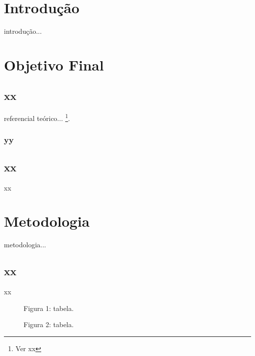 \documentclass[12pt]{article}
\begin{document}
\newpage
\section{Introdução}

introdução...

\newpage
\section{Objetivo Final}

\subsection{xx}

referencial teórico... \footnote{Ver xx}.

\subsubsection{yy}

\newpage
\subsection{xx}

xx

\newpage
\section{Metodologia}

metodologia...

\subsection{xx}

xx

\newpage
\begin{figure}[H]
\centering
\begin{center}
Figura 1: tabela.
\end{center}
\end{figure}

\begin{figure}[H]
\centering
\begin{center}
Figura 2: tabela.
\end{center}
\end{figure}
\end{document}
